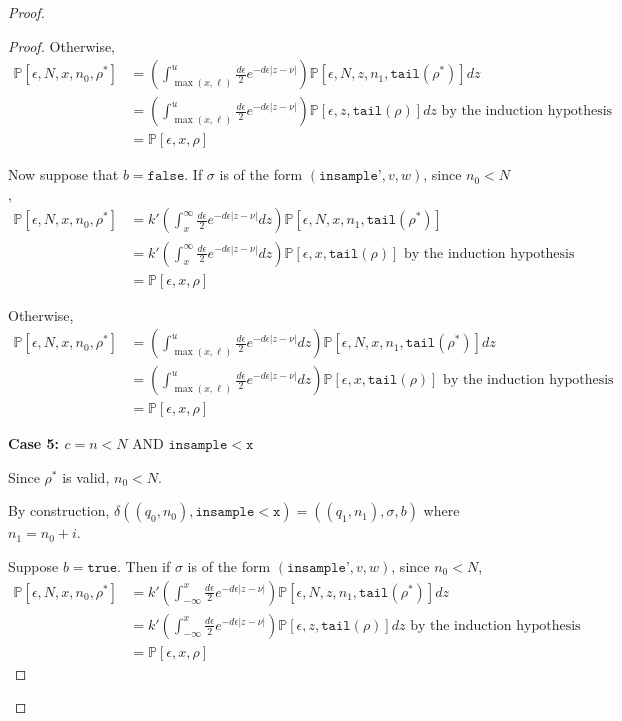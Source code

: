 \documentclass[12pt]{article}
\newcommand{\PP}{\mathbb{P}}
\newcommand{\lguard}{\texttt{insample} < \texttt{x}}
\newcommand{\laguard}{n<N\text{ AND }\texttt{insample} < \texttt{x}}
\theoremstyle{definition}
\begin{document}
\begin{proof}
\begin{proof}
	Otherwise, 
	\begin{align*}
		\PP[\epsilon, N, x, n_0, \rho^*] &= \left(\int_{\max(x, \ell)}^u\frac{d\epsilon}{2}e^{-d\epsilon|z-\nu|}\right)\PP[\epsilon, N, z, n_1, \texttt{tail}(\rho^*)]dz \\
		&= \left(\int_{\max(x, \ell)}^u\frac{d\epsilon}{2}e^{-d\epsilon|z-\nu|}\right)\PP[\epsilon, z, \texttt{tail}(\rho)]dz \text{ by the induction hypothesis }\\
		&= \PP[\epsilon, x, \rho]
	\end{align*}

	Now suppose that $b = \texttt{false}$. If $\sigma$ is of the form $(\texttt{insample'}, v, w)$, since $n_0 < N$, 
	\begin{align*}
		\PP[\epsilon, N, x, n_0, \rho^*] &= k'\left(\int_x^\infty\frac{d\epsilon}{2}e^{-d\epsilon|z-\nu|}dz\right)\PP[\epsilon, N, x, n_1, \texttt{tail}(\rho^*)]\\
		&= k'\left(\int_x^\infty\frac{d\epsilon}{2}e^{-d\epsilon|z-\nu|}dz\right)\PP[\epsilon, x, \texttt{tail}(\rho)] \text{ by the induction hypothesis }\\
		&= \PP[\epsilon, x, \rho]
	\end{align*}

	Otherwise, 
	\begin{align*}
		\PP[\epsilon, N, x, n_0, \rho^*] &= \left(\int_{\max(x, \ell)}^u\frac{d\epsilon}{2}e^{-d\epsilon|z-\nu|}dz\right)\PP[\epsilon, N, x, n_1, \texttt{tail}(\rho^*)]dz \\
		&= \left(\int_{\max(x, \ell)}^u\frac{d\epsilon}{2}e^{-d\epsilon|z-\nu|}dz\right)\PP[\epsilon, x, \texttt{tail}(\rho)] \text{ by the induction hypothesis }\\
		&= \PP[\epsilon, x, \rho]
	\end{align*}

	\textbf{Case 5: $c = \laguard$}

	Since $\rho^*$ is valid, $n_0 < N$. 

	By construction, $\delta((q_0, n_0), \lguard) = ((q_1, n_1), \sigma, b)$ where $n_1 = n_0+i$. 

	Suppose $b = \texttt{true}$. Then if $\sigma$ is of the form $(\texttt{insample'}, v, w)$, since $n_0 < N$, 
		\begin{align*}
			\PP[\epsilon, N, x, n_0, \rho^*] &= k'\left(\int_{-\infty}^x\frac{d\epsilon}{2}e^{-d\epsilon|z-\nu|}\right)\PP[\epsilon, N, z, n_1, \texttt{tail}(\rho^*)]dz \\
			&= k'\left(\int_{-\infty}^x\frac{d\epsilon}{2}e^{-d\epsilon|z-\nu|}\right)\PP[\epsilon, z, \texttt{tail}(\rho)]dz \text{ by the induction hypothesis }\\
			&= \PP[\epsilon, x, \rho]
		\end{align*}


\end{proof}
\end{proof}
\end{document}
